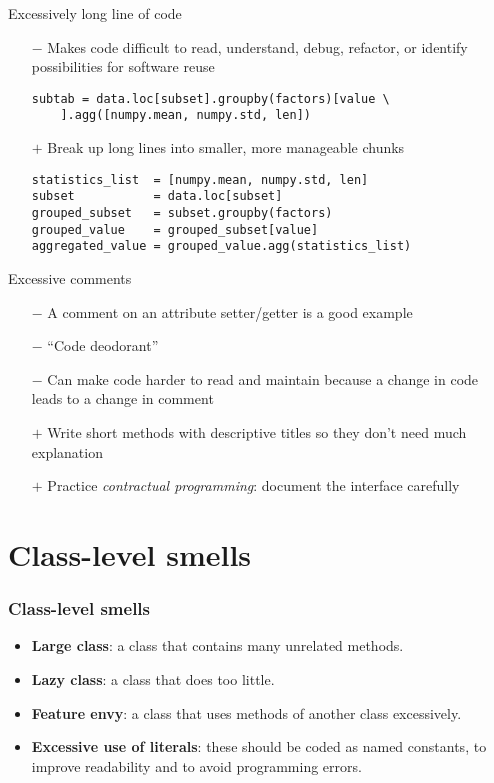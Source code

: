 \documentclass{beamer}
\begin{document}
\begin{frame}[fragile]{Excessively long line of code}
\begin{itemize}
    \item[$-$] Makes code difficult to read, understand, debug, refactor, or identify possibilities for software reuse
\begin{lstlisting}[style=python]
subtab = data.loc[subset].groupby(factors)[value \
    ].agg([numpy.mean, numpy.std, len])
\end{lstlisting}
    \item[$+$] Break up long lines into smaller, more manageable chunks
\begin{lstlisting}[style=python]
statistics_list  = [numpy.mean, numpy.std, len]
subset           = data.loc[subset]
grouped_subset   = subset.groupby(factors)
grouped_value    = grouped_subset[value]
aggregated_value = grouped_value.agg(statistics_list)
\end{lstlisting}
\end{itemize}
\end{frame}



\begin{frame}[fragile]{Excessive comments}
\begin{itemize}
    \item[$-$] A comment on an attribute setter/getter is a good example
    \item[$-$] ``Code deodorant''
    \item[$-$] Can make code harder to read and maintain because a change in code leads to a change in comment
    \item[$+$] Write short methods with descriptive titles so they don't need much explanation
    \item[$+$] Practice \emph{contractual programming}: document the interface carefully
\end{itemize}
\end{frame}






\section{Class-level smells}

\begin{frame}[fragile]
\frametitle{Class-level smells}
\begin{itemize}
\item \textbf{Large class}: a class that contains many unrelated methods.
\item \textbf{Lazy class}: a class that does too little.
\item \textbf{Feature envy}: a class that uses methods of another class excessively.
\item \textbf{Excessive use of literals}: these should be coded as named constants, to improve readability and to avoid programming errors.
\end{itemize}
\end{frame}
\end{document}
